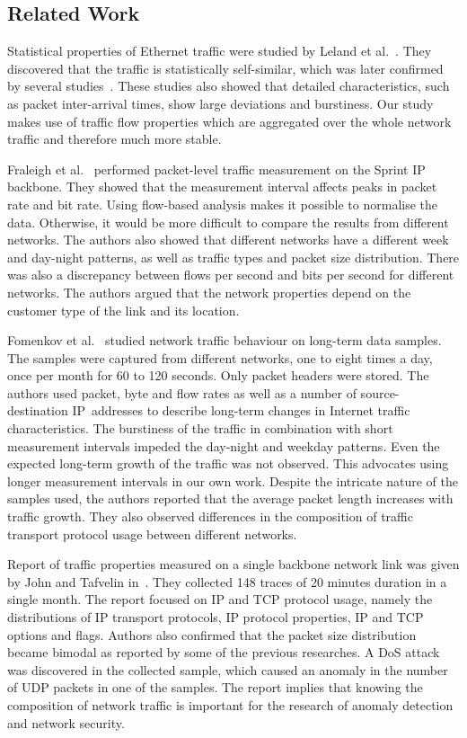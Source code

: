 \subsection{Related Work} \label{subsec:characterization-related_work}

Statistical properties of Ethernet traffic were studied by Leland et al.~\cite{Leland-1993-Self}. They discovered that the traffic is statistically self-similar, which was later confirmed by several studies~\cite{Crovella-1997-Self, Paxson-1995-Wide}. These studies also showed that detailed characteristics, such as packet inter-arrival times, show large deviations and burstiness. Our study makes use of traffic flow properties which are aggregated over the whole network traffic and therefore much more stable.

Fraleigh et al.~\cite{Fraleigh-2003-Packet} performed packet-level traffic measurement on the Sprint IP backbone. They showed that the measurement interval affects peaks in packet rate and bit rate. Using flow-based analysis makes it possible to normalise the data. Otherwise, it would be more difficult to compare the results from different networks. The authors also showed that different networks have a different week and day-night patterns, as well as traffic types and packet size distribution. There was also a discrepancy between flows per second and bits per second for different networks. The authors argued that the network properties depend on the customer type of the link and its location.

Fomenkov et al.~\cite{Fomenkov-2004-Longitudinal} studied network traffic behaviour on long-term data samples. The samples were captured from different networks, one to eight times a day, once per month for 60 to 120 seconds. Only packet headers were stored. The authors used packet, byte and flow rates as well as a number of \mbox{source-destination} IP~addresses to describe long-term changes in Internet traffic characteristics. The burstiness of the traffic in combination with short measurement intervals impeded the day-night and weekday patterns. Even the expected long-term growth of the traffic was not observed. This advocates using longer measurement intervals in our own work. Despite the intricate nature of the samples used, the authors reported that the average packet length increases with traffic growth. They also observed differences in the composition of traffic transport protocol usage between different networks.

Report of traffic properties measured on a single backbone network link was given by John and Tafvelin in~\cite{John-2007-Analysis}. They collected 148 traces of 20 minutes duration in a single month. The report focused on IP and TCP protocol usage, namely the distributions of IP transport protocols, IP protocol properties, IP and TCP options and flags. Authors also confirmed that the packet size distribution became bimodal as reported by some of the previous researches. A DoS attack was discovered in the collected sample, which caused an anomaly in the number of UDP packets in one of the samples. The report implies that knowing the composition of network traffic is important for the research of anomaly detection and network security.

